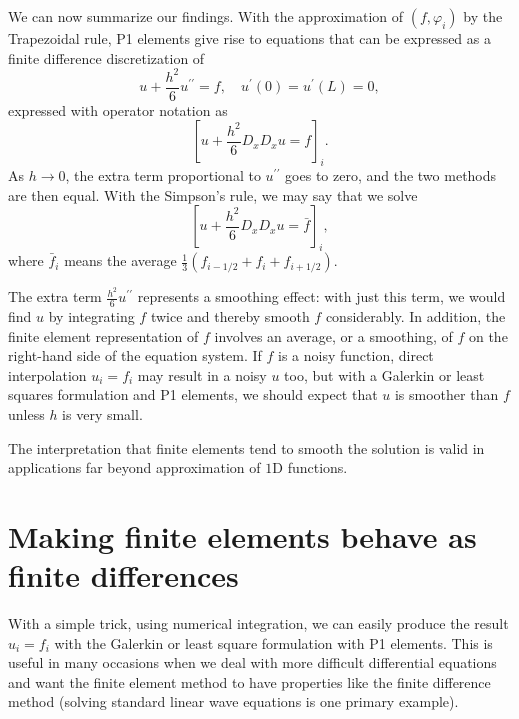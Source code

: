 \documentclass[../main.tex]{subfiles}
\begin{document}
We can now summarize our findings. With the approximation of $\left(f, \varphi_{i}\right)$ by the Trapezoidal rule, P1 elements give rise to equations that can be expressed as a finite difference discretization of
\begin{equation}\label{eqa89}
	u+\frac{h^{2}}{6} u^{\prime \prime}=f, \quad u^{\prime}(0)=u^{\prime}(L)=0,
\end{equation}
expressed with operator notation as
\begin{equation}\label{eqa90}
	\left[u+\frac{h^{2}}{6} D_{x} D_{x} u=f\right]_{i}.
\end{equation}
As $h \rightarrow 0$, the extra term proportional to $u^{\prime \prime}$ goes to zero, and the two methods are then equal.
With the Simpson's rule, we may say that we solve
\begin{equation}\label{eqa91}
	\left[u+\frac{h^{2}}{6} D_{x} D_{x} u=\bar{f}\right]_{i},
\end{equation}
where $\bar{f}_{i}$ means the average $\frac{1}{3}\left(f_{i-1 / 2}+f_{i}+f_{i+1 / 2}\right)$.

The extra term $\frac{h^{2}}{6} u^{\prime \prime}$ represents a smoothing effect: with just this term, we would find $u$ by integrating $f$ twice and thereby smooth $f$ considerably. In addition, the finite element representation of $f$ involves an average, or a smoothing, of $f$ on the right-hand side of the equation system. If $f$ is a noisy function, direct interpolation $u_{i}=f_{i}$ may result in a noisy $u$ too, but with a Galerkin or least squares formulation and P1 elements, we should expect that $u$ is smoother than $f$ unless $h$ is very small.

The interpretation that finite elements tend to smooth the solution is valid in applications far beyond approximation of $1 \mathrm{D}$ functions.

\section[Making finite elements behave as finite differences]{Making finite elements behave as finite differences}
\label{sec:sec_5_3}
\noindent With a simple trick, using numerical integration, we can easily produce the result $u_{i}=f_{i}$ with the Galerkin or least square formulation with P1 elements. This is useful in many occasions when we deal with more difficult differential equations and want the finite element method to have properties like the finite difference method (solving standard linear wave equations is one primary example).
\end{document}
